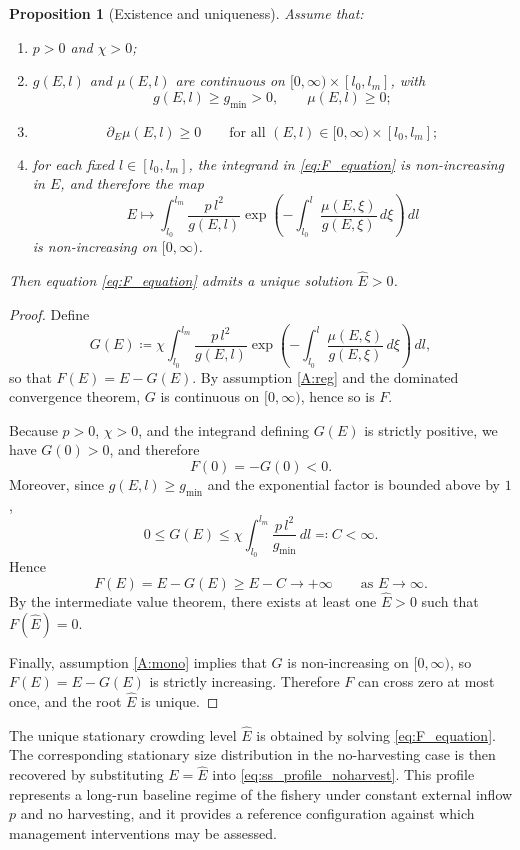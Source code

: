 \documentclass[pdflatex,sn-mathphys-num]{sn-jnl}
\theoremstyle{thmstyleone}
\newtheorem{proposition}[theorem]{Proposition}
\theoremstyle{definition}
\theoremstyle{remark}
\begin{document}
\begin{proposition}[Existence and uniqueness]\label{prop:exist_unique}
Assume that:
\begin{enumerate}[label=(A\arabic*)]
\item\label{A:pchi}
$ p>0 $ and $ \chi>0 $;

\item\label{A:reg}
$g(E,l)$ and $\mu(E,l)$ are continuous on
$[0,\infty)\times[l_0,l_m]$, with
\[
g(E,l)\ge g_{\min}>0,
\qquad
\mu(E,l)\ge 0;
\]

\item\label{A:hazard}
\[
\partial_E\mu(E,l)\ge 0
\qquad
\text{for all } (E,l)\in[0,\infty)\times[l_0,l_m];
\]

\item\label{A:mono}
for each fixed $l\in[l_0,l_m]$, the integrand in \eqref{eq:F_equation} is
non-increasing in $E$, and therefore the map
\[
E\longmapsto
\int_{l_0}^{l_m}
\frac{p\,l^2}{g(E,l)}
\exp\!\left(
-\int_{l_0}^{l}\frac{\mu(E,\xi)}{g(E,\xi)}\,d\xi
\right)\,dl
\]
is non-increasing on $[0,\infty)$.
\end{enumerate}
Then equation \eqref{eq:F_equation} admits a unique solution $\hat E>0$.
\end{proposition}

\begin{proof}
Define
\[
G(E)\coloneqq
\chi\int_{l_0}^{l_m}
\frac{p\,l^2}{g(E,l)}
\exp\!\left(
-\int_{l_0}^{l}\frac{\mu(E,\xi)}{g(E,\xi)}\,d\xi
\right)\,dl,
\]
so that $F(E)=E-G(E)$.
By assumption \ref{A:reg} and the dominated convergence theorem, $G$ is
continuous on $[0,\infty)$, hence so is $F$.

Because $p>0$, $\chi>0$, and the integrand defining $G(E)$ is strictly positive,
we have $G(0)>0$, and therefore
\[
F(0)=-G(0)<0.
\]
Moreover, since $g(E,l)\ge g_{\min}$ and the exponential factor is bounded above
by $1$,
\[
0\le G(E)\le
\chi\int_{l_0}^{l_m}\frac{p\,l^2}{g_{\min}}\,dl
\eqqcolon C<\infty.
\]
Hence
\[
F(E)=E-G(E)\ge E-C\to+\infty
\qquad\text{as } E\to\infty.
\]
By the intermediate value theorem, there exists at least one
$\hat E>0$ such that $F(\hat E)=0$.

Finally, assumption \ref{A:mono} implies that $G$ is non-increasing on
$[0,\infty)$, so $F(E)=E-G(E)$ is strictly increasing. Therefore $F$ can cross
zero at most once, and the root $\hat E$ is unique.
\end{proof}

The unique stationary crowding level $\hat E$ is obtained by solving
\eqref{eq:F_equation}. The corresponding stationary size distribution in the
no-harvesting case is then recovered by substituting $E=\hat E$ into
\eqref{eq:ss_profile_noharvest}. 
This profile represents a long-run baseline
regime of the fishery under constant external inflow $p$ and no harvesting, and
it provides a reference configuration against which management interventions may
be assessed.
\end{document}
